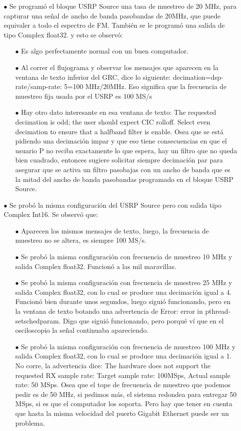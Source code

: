 \begin{itemize}
	\item [$\bullet$] Se programó el bloque USRP Source una tasa de muestreo de 20 MHz, para capturar una señal de ancho de banda pasobandas de 20MHz, que puede equivaler a todo el espectro de FM. También se le programó una salida de tipo Complex float32.  y esto se observó:
	\begin{itemize}
		\item [$\bullet$] Es algo perfectamente normal con un buen computador.
		\item [$\bullet$] Al correr el flujograma y observar los mensajes que aparecen en la ventana de texto inferior del GRC, dice lo siguiente: decimation=dsp-rate/samp-rate: 5=100 MHz/20MHz. Eso significa que la frecuencia de muestreo fija usada por el USRP es 100 MS/s
		\item [$\bullet$] Hay otro dato interesante en esa ventana de texto: The requested decimation is odd; the user should expect CIC rolloff. Select even decimation to ensure that a halfband filter is enable. Osea que se está pidiendo una decimación impar y que eso tiene consecuencias en que el usuario P no reciba exactamente lo que espera, hay un filtro que no queda bien cuadrado, entonces sugiere solicitar siempre decimación par para asegurar que se activa un filtro pasobajas con un ancho de banda que es la mitad del ancho de banda pasobandas programado en el bloque USRP Source.	
	\end{itemize}
	\item [$\bullet$] Se probó la misma configuración del USRP Source pero con salida tipo Complex Int16. Se observó que:
	\begin{itemize}
			\item [$\bullet$] Aparecen los mismos mensajes de texto, luego, la frecuencia de muestreo no se altera, es siempre 100 MS/s.
			\item [$\bullet$] Se probó la misma configuración con frecuencia de muestreo 10 MHz y salida Complex float32. Funcionó a las mil maravillas.
			\item [$\bullet$] Se probó la misma configuración con frecuencia de muestreo 25 MHz y salida Complex float32, con lo cual se produce una decimación igual a 4. Funcionó bien durante unos segundos, luego siguió funcionando, pero en la ventana de texto botando una advertencia de Error: error in pthread-setschedparam. Digo que siguió funcionando, pero porqué ví que en el osciloscopio la señal continuaba apareciendo. 
			\item [$\bullet$] Se probó la misma configuración con frecuencia de muestreo 100 MHz y salida Complex float32, con lo cual se produce una decimación igual a 1. No corre, la advertencia dice: The hardware does not support the requested RX sample rate: Target sample rate: 100MSps, Actual sample rate: 50 MSps. Osea que el tope de frecuencia de muestreo que podemos pedir es de 50 MHz, si pedimos más, el sistema redondea para entregar 50 MSps, si es que el computador los soporta. Pero hay que tener en cuenta que hasta la misma velocidad del puerto Gigabit Ethernet puede ser un problema.

\end{itemize}
\end{itemize}
